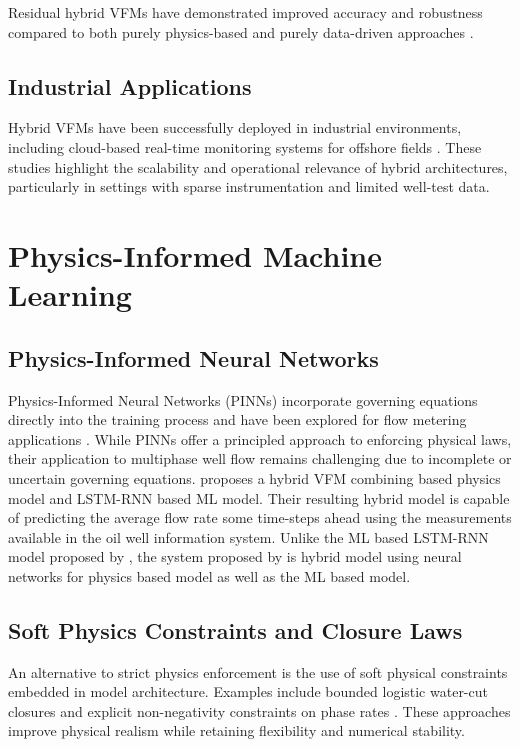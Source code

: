 \documentclass[12pt,APA]{uomthesis}
\begin{document}
Residual hybrid VFMs have demonstrated improved accuracy and robustness compared to both purely physics-based and purely data-driven approaches \citep{ishak2022virtual,gryzlov2023combining}.

\subsection{Industrial Applications}
Hybrid VFMs have been successfully deployed in industrial environments, including cloud-based real-time monitoring systems for offshore fields \citep{nemoto2023cloud}. These studies highlight the scalability and operational relevance of hybrid architectures, particularly in settings with sparse instrumentation and limited well-test data.

\section{Physics-Informed Machine Learning}
\subsection{Physics-Informed Neural Networks}
Physics-Informed Neural Networks (PINNs) incorporate governing equations directly into the training process and have been explored for flow metering applications \citep{franklin2022physics}. While PINNs offer a principled approach to enforcing physical laws, their application to multiphase well flow remains challenging due to incomplete or uncertain governing equations.
\citep{franklin2022physics} proposes a hybrid VFM combining  based physics model and LSTM-RNN based ML model. Their resulting hybrid model is capable of predicting the average flow rate some time-steps ahead using the measurements available in the oil well information system. Unlike the ML based LSTM-RNN model proposed by \citep{andrianov2018machine}, the system proposed by \citep{franklin2022physics} is hybrid model using neural networks for physics based model as well as the ML based model. 

\subsection{Soft Physics Constraints and Closure Laws}
An alternative to strict physics enforcement is the use of soft physical constraints embedded in model architecture. Examples include bounded logistic water-cut closures and explicit non-negativity constraints on phase rates \citep{bikmukhametov2020first}. These approaches improve physical realism while retaining flexibility and numerical stability.
\end{document}
